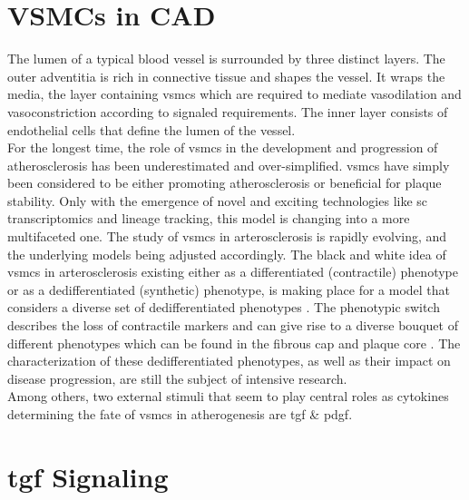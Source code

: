 \section{VSMCs in CAD}
\label{sec:haosms}
The lumen of a typical blood vessel is surrounded by three distinct layers. The outer adventitia is rich in connective tissue and shapes the vessel. It wraps the media, the layer containing \acp{vsmc} which are required to mediate vasodilation and vasoconstriction according to signaled requirements. The inner layer consists of endothelial cells that define the lumen of the vessel. \cite{tuckerAnatomyBloodVessels2022a, yapSixShadesVascular2021}\\
[cells in \ac{cad}] For the longest time, the role of \acp{vsmc} in the development and progression of atherosclerosis has been underestimated and over-simplified. \acp{vsmc} have simply been considered to be either promoting atherosclerosis or beneficial for plaque stability. Only with the emergence of novel and exciting technologies like \ac{sc} transcriptomics and lineage tracking, this model is changing into a more multifaceted one. \cite{liuSmoothMuscleCell2019, grootaertVascularSmoothMuscle2021, yapSixShadesVascular2021} The study of \acp{vsmc} in arterosclerosis is rapidly evolving, and the underlying models being adjusted accordingly. The black and white idea of \acp{vsmc} in arterosclerosis existing either as a differentiated (contractile) phenotype or as a dedifferentiated (synthetic) phenotype, is making place for a model that considers a diverse set of dedifferentiated phenotypes \cite{liuSmoothMuscleCell2019, grootaertVascularSmoothMuscle2021, yapSixShadesVascular2021}. The phenotypic switch describes the loss of contractile markers and can give rise to a diverse bouquet of different phenotypes which can be found in the fibrous cap and plaque core \cite{grootaertVascularSmoothMuscle2021}. The characterization of these dedifferentiated phenotypes, as well as their impact on disease progression, are still the subject of intensive research.\\
Among others, two external stimuli that seem to play central roles as cytokines determining the fate of \acp{vsmc} in atherogenesis are \ac{tgf} \& \ac{pdgf}.


\section{\acs{tgf} Signaling}
\label{sec:tgf}


